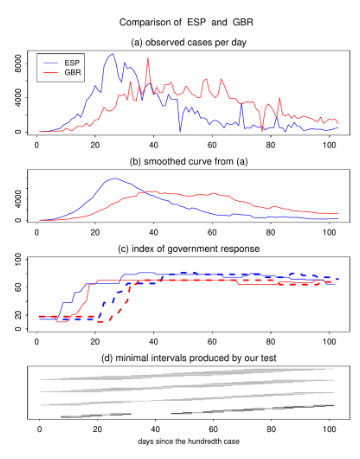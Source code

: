 \documentclass[a4paper,12pt]{article}
\numberwithin{equation}{section}
\begin{document}
\begin{figure}[t!]\ContinuedFloat
\begin{subfigure}[b]{0.475\textwidth}
\includegraphics[width=\textwidth]{plots/ESP_vs_GBR}
\end{subfigure}\hspace{0.55cm}
\begin{subfigure}[b]{0.475\textwidth}

\end{subfigure}
\end{figure}
\end{document}
